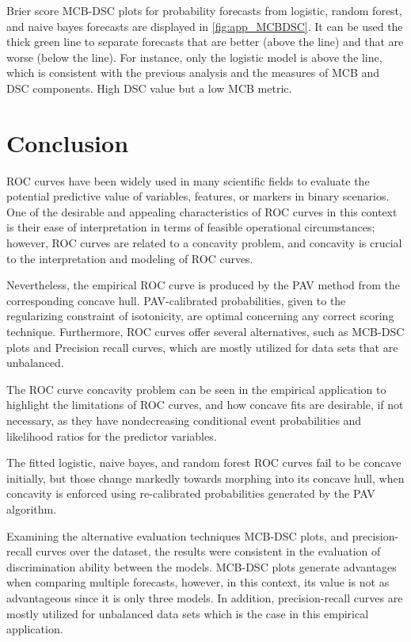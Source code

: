 \documentclass[a4paper,12pt]{article}
\numberwithin{equation}{section}
\begin{document}
Brier score MCB-DSC plots for probability forecasts from logistic, random forest, and naive bayes forecasts are displayed in \ref{fig:app_MCBDSC}. It can be used the thick green line to separate forecasts that are better (above the line) and that are worse (below the line). For instance, only the logistic model is above the line, which is consistent with the previous analysis and the measures of MCB and DSC components. High DSC value but a low MCB metric. 


   \section{Conclusion}
   ROC curves have been widely used in many scientific fields to evaluate the potential predictive value of variables, features, or markers in binary scenarios. One of the desirable and appealing characteristics of ROC curves in this context is their ease of interpretation in terms of feasible operational circumstances; however, ROC curves are related to a concavity problem, and concavity is crucial to the interpretation and modeling of ROC curves.\bigskip 

   Nevertheless, the empirical ROC curve is produced by the PAV method from the corresponding concave hull. PAV-calibrated probabilities, given to the regularizing constraint of isotonicity, are optimal concerning any correct scoring technique. Furthermore, ROC curves offer several alternatives, such as MCB-DSC plots and Precision recall curves, which are mostly utilized for data sets that are unbalanced.\bigskip 
   
   The ROC curve concavity problem can be seen in the empirical application to highlight the limitations of ROC curves, and how concave fits are desirable, if not necessary, as they have nondecreasing conditional event probabilities and likelihood ratios for the predictor variables.\bigskip 
   
   The fitted logistic, naive bayes, and random forest ROC curves fail to be concave initially, but those change markedly towards morphing into its concave hull, when concavity is enforced using re-calibrated probabilities generated by the PAV algorithm.\bigskip 

   Examining the alternative evaluation techniques MCB-DSC plots, and precision-recall curves over the dataset, the results were consistent in the evaluation of discrimination ability between the models. MCB-DSC plots generate advantages when comparing multiple forecasts, however, in this context, its value is not as advantageous since it is only three models. In addition, precision-recall curves are mostly utilized for unbalanced data sets which is the case in this empirical application. \bigskip 
   
\end{document}
